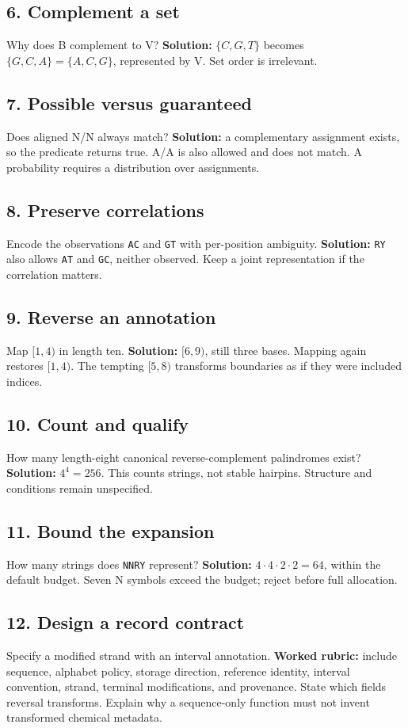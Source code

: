 \subsection*{6. Complement a set}
Why does B complement to V? \textbf{Solution:} $\{C,G,T\}$ becomes
$\{G,C,A\}=\{A,C,G\}$, represented by V. Set order is irrelevant.

\subsection*{7. Possible versus guaranteed}
Does aligned N/N always match? \textbf{Solution:} a complementary assignment
exists, so the predicate returns true. A/A is also allowed and does not
match. A probability requires a distribution over assignments.

\subsection*{8. Preserve correlations}
Encode the observations \texttt{AC} and \texttt{GT} with per-position
ambiguity. \textbf{Solution:} \texttt{RY} also allows \texttt{AT} and
\texttt{GC}, neither observed. Keep a joint representation if the correlation matters.

\subsection*{9. Reverse an annotation}
Map $[1,4)$ in length ten. \textbf{Solution:} $[6,9)$, still three bases.
Mapping again restores $[1,4)$. The tempting $[5,8)$ transforms boundaries
as if they were included indices.

\subsection*{10. Count and qualify}
How many length-eight canonical reverse-complement palindromes exist?
\textbf{Solution:} $4^4=256$. This counts strings, not stable hairpins.
Structure and conditions remain unspecified.

\subsection*{11. Bound the expansion}
How many strings does \texttt{NNRY} represent?
\textbf{Solution:} $4\cdot4\cdot2\cdot2=64$, within the default budget.
Seven N symbols exceed the budget; reject before full allocation.

\subsection*{12. Design a record contract}
Specify a modified strand with an interval annotation.
\textbf{Worked rubric:} include sequence, alphabet policy, storage direction,
reference identity, interval convention, strand, terminal modifications,
and provenance. State which fields reversal transforms. Explain why a
sequence-only function must not invent transformed chemical metadata.
